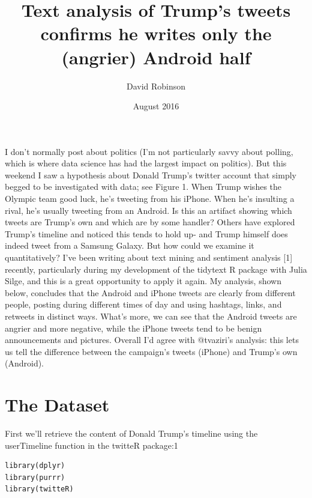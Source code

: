 \documentclass[a4paper,12pt]{article}
\title{Text analysis of Trump’s tweets confirms he writes only the
(angrier) Android half}
\author{David Robinson}
\date{August 2016}
\begin{document}
\maketitle

I don’t normally post about politics (I’m not particularly savvy about polling, which is where
data science has had the largest impact on politics). But this weekend I saw a hypothesis about
Donald Trump’s twitter account that simply begged to be investigated with data; see Figure 1.
When Trump wishes the Olympic team good luck, he’s tweeting from his iPhone. When he’s
insulting a rival, he’s usually tweeting from an Android. Is this an artifact showing which tweets
are Trump’s own and which are by some handler?
Others have explored Trump’s timeline and noticed this tends to hold up- and Trump himself
does indeed tweet from a Samsung Galaxy. But how could we examine it quantitatively? I’ve been
writing about text mining and sentiment analysis [1] recently, particularly during my development
of the tidytext R package with Julia Silge, and this is a great opportunity to apply it again.
My analysis, shown below, concludes that the Android and iPhone tweets are clearly from
different people, posting during different times of day and using hashtags, links, and retweets
in distinct ways. What’s more, we can see that the Android tweets are angrier and more
negative, while the iPhone tweets tend to be benign announcements and pictures. Overall I’d agree
with @tvaziri’s analysis: this lets us tell the difference between the campaign’s tweets (iPhone) and
Trump’s own (Android).

\section{The Dataset}
First we’ll retrieve the content of Donald Trump’s timeline using the userTimeline function in the
twitteR package:1


\begin{lstlisting}
library(dplyr)
library(purrr)
library(twitteR)
\end{lstlisting}

\end{document}
